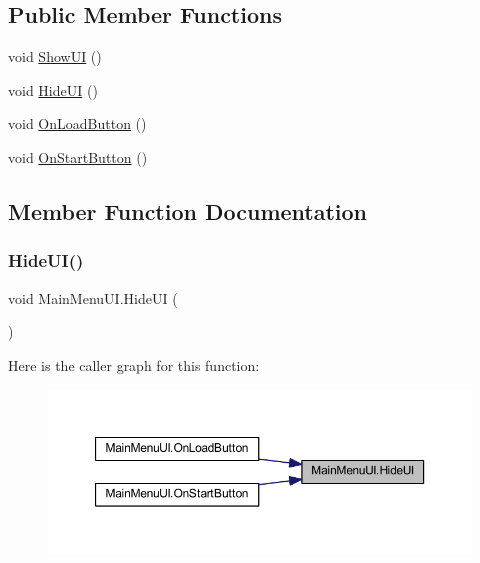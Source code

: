 \subsection*{Public Member Functions}
\begin{DoxyCompactItemize}
\item 
void \mbox{\hyperlink{class_main_menu_u_i_ab70d817a22e65d2258cfd0d9a48404a8}{Show\+UI}} ()
\item 
void \mbox{\hyperlink{class_main_menu_u_i_a880a33ba6d600fee9ee4635b94bded8c}{Hide\+UI}} ()
\item 
void \mbox{\hyperlink{class_main_menu_u_i_ab97fc6c28c9bfe985c650c7572aec0fc}{On\+Load\+Button}} ()
\item 
void \mbox{\hyperlink{class_main_menu_u_i_ac567ba394028f00989750f4782325daf}{On\+Start\+Button}} ()
\end{DoxyCompactItemize}


\subsection{Member Function Documentation}
\mbox{\label{class_main_menu_u_i_a880a33ba6d600fee9ee4635b94bded8c}} 
\subsubsection{\texorpdfstring{HideUI()}{HideUI()}}
{\footnotesize\ttfamily void Main\+Menu\+U\+I.\+Hide\+UI (\begin{DoxyParamCaption}{ }\end{DoxyParamCaption})}

Here is the caller graph for this function\+:\nopagebreak
\begin{figure}[H]
\begin{center}
\leavevmode
\includegraphics[width=350pt]{class_main_menu_u_i_a880a33ba6d600fee9ee4635b94bded8c_icgraph}
\end{center}
\end{figure}
\mbox{\label{class_main_menu_u_i_ab97fc6c28c9bfe985c650c7572aec0fc}} 
